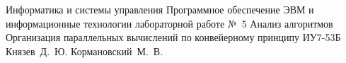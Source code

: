 \makereporttitle
    {Информатика и системы управления}
    {Программное обеспечение ЭВМ и информационные технологии}
    {лабораторной работе №~5}
    {Анализ алгоритмов}
    {Организация параллельных вычислений по конвейерному принципу}
    {}
    {ИУ7-53Б}
    {Князев~Д.~Ю.}
    {Кормановский~М.~В.}
